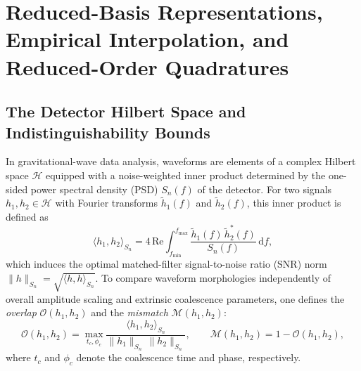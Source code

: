 \documentclass[11pt, a4paper]{article}
\begin{document}
\section{Reduced-Basis Representations, Empirical Interpolation, and Reduced-Order Quadratures}
\label{sec:rb_eim_roq}

\subsection{The Detector Hilbert Space and Indistinguishability Bounds}

In gravitational-wave data analysis, waveforms are elements of a complex Hilbert space $\mathcal{H}$ equipped with a noise-weighted inner product determined by the one-sided power spectral density (PSD) $S_n(f)$ of the detector. For two signals $h_1, h_2 \in \mathcal{H}$ with Fourier transforms $\tilde{h}_1(f)$ and $\tilde{h}_2(f)$, this inner product is defined as
\begin{equation}
\langle h_1, h_2 \rangle_{S_n} = 4\,\mathrm{Re} \int_{f_{\min}}^{f_{\max}} \frac{\tilde{h}_1(f)\,\tilde{h}_2^*(f)}{S_n(f)}\,\mathrm{d}f ,
\label{eq:psd_inner_product}
\end{equation}
which induces the optimal matched-filter signal-to-noise ratio (SNR) norm $\|h\|_{S_n} = \sqrt{\langle h, h \rangle_{S_n}}$. To compare waveform morphologies independently of overall amplitude scaling and extrinsic coalescence parameters, one defines the \emph{overlap} $\mathcal{O}(h_1, h_2)$ and the \emph{mismatch} $\mathcal{M}(h_1, h_2)$:
\begin{equation}
\mathcal{O}(h_1, h_2) = \max_{t_c, \phi_c} \frac{\langle h_1, h_2 \rangle_{S_n}}{\|h_1\|_{S_n}\,\|h_2\|_{S_n}}, \qquad
\mathcal{M}(h_1, h_2) = 1 - \mathcal{O}(h_1, h_2) ,
\label{eq:mismatch}
\end{equation}
where $t_c$ and $\phi_c$ denote the coalescence time and phase, respectively.
\end{document}
